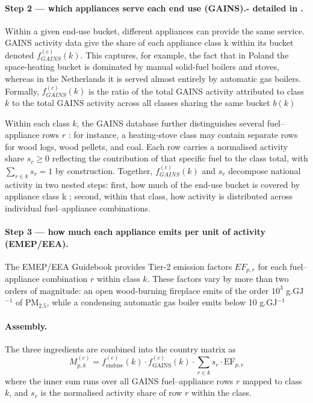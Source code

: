 \paragraph{Step 2 — which appliances serve each end use (GAINS).- detailed in .}
Within a given end-use bucket, different appliances can provide the same service. GAINS activity data give the share of each appliance class k within its bucket denoted $f_{GAINS}^{(c)} (k)$. This captures, for example, the fact that in Poland the space-heating bucket is dominated by manual solid-fuel boilers and stoves, whereas in the Netherlands it is served almost entirely by automatic gas boilers. Formally, $f_{GAINS}^{(c)} (k)$ is the ratio of the total GAINS activity attributed to class $k$ to the total GAINS activity across all classes sharing the same bucket $b(k)$

Within each class $k$, the GAINS database further distinguishes several fuel--appliance rows $r$ : for instance, a heating-stove class may contain separate rows for wood logs, wood pellets, and coal. Each row carries a normalised activity share $s_r \geq 0$ reflecting the contribution of that specific fuel to the class total, with $\sum_{r \in k} s_r = 1$ by construction.
Together,  $f_{GAINS}^{(c)} (k)$   and  $s_r$  decompose national activity in two nested steps: first, how much of the end-use bucket is covered by appliance class  k ; second, within that class, how activity is distributed across individual fuel--appliance combinations.


\paragraph{Step 3 — how much each appliance emits per unit of activity (EMEP/EEA).}


The EMEP/EEA Guidebook provides Tier-2 emission factors $EF_{p,r}$  for each fuel--appliance combination $r$ within class $k$.  These factors vary by more than two orders of magnitude: an open wood-burning fireplace emits of the order $10^3$ g.GJ$^{-1}$ of PM$_{2.5}$, while a condensing automatic gas boiler emits below 10 g.GJ$^{-1}$


\paragraph{Assembly.}
The three ingredients are combined into the country matrix as
\begin{equation}
  M^{(c)}_{p,k} =
  f_{\mathrm{enduse}}^{(c)}(k)\cdot
  f_{\mathrm{GAINS}}^{(c)}(k)\cdot
  \sum_{r\in k} s_r \cdot \mathrm{EF}_{p,r}
  \label{eq:othercomb-Mmatrix}
\end{equation}
where the inner sum runs over all GAINS fuel--appliance rows $r$  mapped to class  $k$, and $s_r$  is the normalised activity share of row $r$ within the class.

